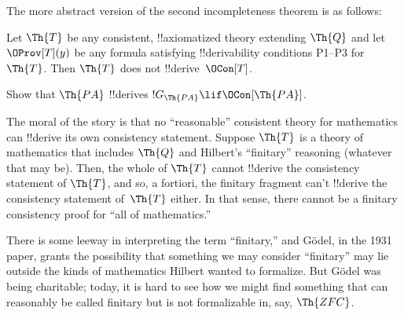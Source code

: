 \documentclass[../../../include/open-logic-section]{subfiles}
\begin{document}
The more abstract version of the second incompleteness theorem is as follows:

\begin{thm}
 Let $\Th{T}$ be any
consistent, !!{axiomatized} theory extending $\Th{Q}$ and let
$\OProv[T](y)$ be any formula satisfying !!{derivability} conditions
P1--P3 for~$\Th{T}$. Then $\Th{T}$ does not !!{derive}~$\OCon[T]$.
\end{thm}

\begin{prob}
Show that $\Th{PA}$ !!{derive}s $!G_{\Th{PA}} \lif \OCon[\Th{PA}]$.
\end{prob}

\begin{digress}
The moral of the story is that no ``reasonable'' consistent theory for
mathematics can !!{derive} its own consistency statement. Suppose
$\Th{T}$ is a theory of mathematics that includes $\Th{Q}$ and
Hilbert's ``finitary'' reasoning (whatever that may be). Then, the
whole of $\Th{T}$ cannot !!{derive} the consistency statement of
$\Th{T}$, and so, a fortiori, the finitary fragment can't !!{derive}
the consistency statement of~$\Th{T}$ either. In that sense, there
cannot be a finitary consistency proof for ``all of mathematics.''

There is some leeway in interpreting the term ``finitary,'' and G\"odel, in
the 1931 paper, grants the possibility that something we may consider
``finitary'' may lie outside the kinds of mathematics Hilbert wanted
to formalize. But G\"odel was being charitable; today, it is hard to
see how we might find something that can reasonably be called finitary
but is not formalizable in, say, $\Th{ZFC}$.
\end{digress}
\end{document}
